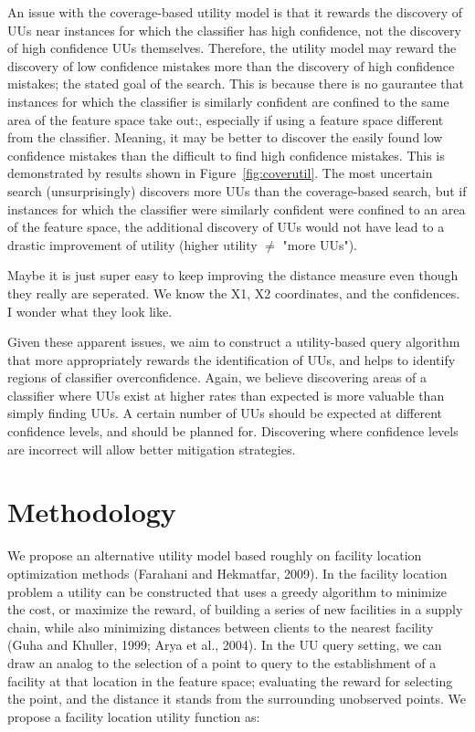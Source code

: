 \documentclass[letterpaper]{article} %
\newcommand{\km}[1]{{\color{red} #1}} %
\newcommand{\wdb}[1]{{\color{blue} #1}} %
\begin{document}
An issue with the coverage-based utility model is that it rewards the discovery of UUs near instances for which the classifier has high confidence, not the discovery of high confidence UUs themselves.  Therefore, the utility model may reward the discovery of low confidence mistakes more than the discovery of high confidence mistakes; the stated goal of the search. This is because there is no gaurantee that instances for which the classifier is similarly confident are confined to the same area of the feature space \wdb{take out:, especially if using a feature space different from the classifier}.  Meaning, it may be better to discover the easily found low confidence mistakes than the difficult to find high confidence mistakes. This is demonstrated by results shown in Figure~\ref{fig:coverutil}.  The most uncertain search (unsurprisingly) discovers more UUs than the coverage-based search, but if instances for which the classifier were similarly confident were confined to an area of the feature space, the additional discovery of UUs would not have lead to a drastic improvement of utility \wdb{(higher utility $\ne$ "more UUs")}.

\wdb{Maybe it is just super easy to keep improving the distance measure even though they really are seperated.  We know the X1, X2 coordinates, and the confidences.  I wonder what they look like.}

Given these apparent issues, we aim to construct a utility-based query algorithm that more appropriately rewards the identification of UUs, and helps to identify regions of classifier overconfidence.  \wdb{Again, we believe discovering areas of a classifier where UUs exist at higher rates than expected is more valuable than simply finding UUs.  A certain number of UUs should be expected at different confidence levels, and should be planned for.  Discovering where confidence levels are incorrect will allow better mitigation strategies. }

\section{Methodology}

We propose an alternative utility model based roughly on facility location optimization methods  \km{(Farahani and Hekmatfar, 2009)}. In the facility location problem a utility can be constructed that uses a greedy algorithm to minimize the cost, or maximize the reward, of building a series of new facilities in a supply chain, while also minimizing distances between clients to the nearest facility  \km{(Guha and Khuller, 1999; Arya et al., 2004)}. In the UU query setting, we can draw an analog to the selection of a point to query to the establishment of a facility at that location in the feature space; evaluating the reward for selecting the point, and the distance it stands from the surrounding unobserved points. We propose a facility location utility function as: 
\end{document}
